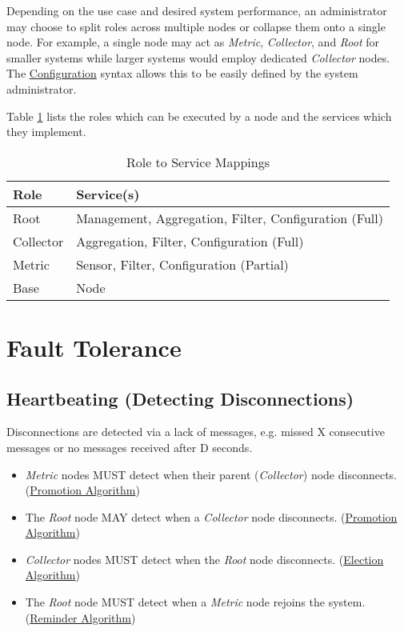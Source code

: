 Depending on the use case and desired system performance, an administrator may choose to split roles across multiple
nodes or collapse them onto a single node. For example, a single node may act as \textit{Metric}, \textit{Collector},
and \textit{Root} for smaller systems while larger systems would employ dedicated \textit{Collector} nodes. The \dcamp
\hyperref[configuration]{Configuration} syntax allows this to be easily defined by the system administrator.

Table \ref{tab:role_to_services} lists the roles which can be executed by a \dcamp node and the services which they
implement.

\begin{table}
\begin{tabular}{l l}

\hline
\textbf{Role} & \textbf{Service(s)} \\
\hline

Root & Management, Aggregation, Filter, Configuration (Full) \\

Collector & Aggregation, Filter, Configuration (Full) \\

Metric & Sensor, Filter, Configuration (Partial) \\

Base & Node \\

\end{tabular}
\caption{Role to Service Mappings}
\label{tab:role_to_services}
\end{table}

\section{Fault Tolerance}

\subsection{Heartbeating (Detecting Disconnections)}

Disconnections are detected via a lack of messages, e.g. missed X consecutive messages or no messages received after D
seconds.

\begin{itemize}
\item \textit{Metric} nodes MUST detect when their parent (\textit{Collector}) node disconnects.
      (\hyperref[algor_promo]{Promotion Algorithm})
\item The \textit{Root} node MAY detect when a \textit{Collector} node disconnects. (\hyperref[algor_promo]{Promotion
      Algorithm})
\item \textit{Collector} nodes MUST detect when the \textit{Root} node disconnects. (\hyperref[algor_elect]{Election
      Algorithm})
\item The \textit{Root} node MUST detect when a \textit{Metric} node rejoins the system.
      (\hyperref[algor_remind]{Reminder Algorithm})
\end{itemize}

